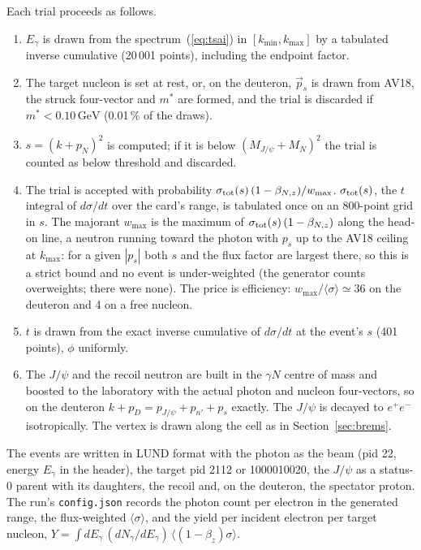 \documentclass[11pt,a4paper]{article}
\newcommand{\Eg}{E_\gamma}
\newcommand{\jpsi}{J/\psi}
\newcommand{\GeV}{\,\mathrm{GeV}}
\newcommand{\ps}{p_s}
\begin{document}
Each trial proceeds as follows.
\begin{enumerate}
\item $\Eg$ is drawn from the spectrum~(\ref{eq:tsai}) in $[k_{\min},k_{\max}]$ by a tabulated inverse
      cumulative (20\,001 points), including the endpoint factor.
\item The target nucleon is set at rest, or, on the deuteron, $\vec\ps$ is drawn from AV18, the struck
      four-vector and $m^*$ are formed, and the trial is discarded if $m^*<0.10\GeV$ (0.01\,\% of the
      draws).
\item $s=(k+p_N)^2$ is computed; if it is below $(M_{\jpsi}+M_N)^2$ the trial is counted as below
      threshold and discarded.
\item The trial is accepted with probability $\sigma_{\rm tot}(s)\,(1-\beta_{N,z})/w_{\max}$.
      $\sigma_{\rm tot}(s)$, the $t$ integral of $d\sigma/dt$ over the card's range, is tabulated once
      on an 800-point grid in $s$.  The majorant $w_{\max}$ is the maximum of
      $\sigma_{\rm tot}(s)\,(1-\beta_{N,z})$ along the head-on line, a neutron running toward the
      photon with $\ps$ up to the AV18 ceiling at $k_{\max}$: for a given $|\ps|$ both $s$ and the
      flux factor are largest there, so this is a strict bound and no event is under-weighted (the
      generator counts overweights; there were none).  The price is efficiency: $w_{\max}/\langle
      \sigma\rangle\simeq36$ on the deuteron and 4 on a free nucleon.
\item $t$ is drawn from the exact inverse cumulative of $d\sigma/dt$ at the event's $s$ (401 points),
      $\phi$ uniformly.
\item The $\jpsi$ and the recoil neutron are built in the $\gamma N$ centre of mass and boosted to the
      laboratory with the actual photon and nucleon four-vectors, so on the deuteron
      $k+p_D=p_{\jpsi}+p_{n'}+p_s$ exactly.  The $\jpsi$ is decayed to $e^+e^-$ isotropically.  The
      vertex is drawn along the cell as in Section~\ref{sec:brems}.
\end{enumerate}
The events are written in LUND format with the photon as the beam (pid 22, energy $\Eg$ in the
header), the target pid 2112 or 1000010020, the $\jpsi$ as a status-0 parent with its daughters, the
recoil and, on the deuteron, the spectator proton.  The run's \texttt{config.json} records the photon
count per electron in the generated range, the flux-weighted $\langle\sigma\rangle$, and the yield per
incident electron per target nucleon, $Y=\int d\Eg\,(dN_\gamma/d\Eg)\,\langle(1-\beta_z)\sigma\rangle$.
\end{document}

